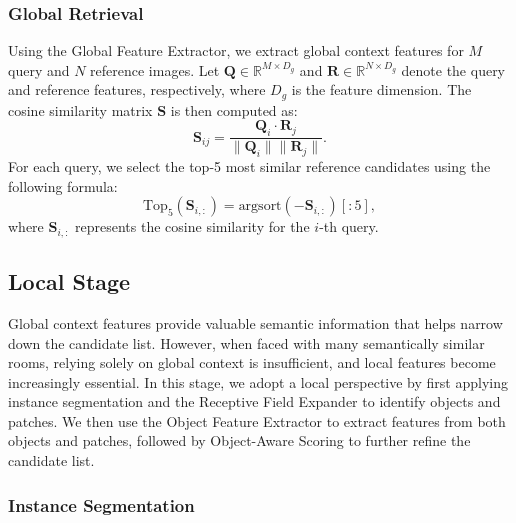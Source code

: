 \subsubsection{Global Retrieval}

Using the Global Feature Extractor, we extract global context features for \(M\) query and \(N\) reference images. Let \(\mathbf{Q} \in \mathbb{R}^{M \times D_g}\) and \(\mathbf{R} \in \mathbb{R}^{N \times D_g}\) denote the query and reference features, respectively, where \(D_g\) is the feature dimension. The cosine similarity matrix \(\mathbf{S}\) is then computed as:
\begin{equation}
    \mathbf{S}_{ij} = \frac{\mathbf{Q}_i \cdot \mathbf{R}_j}{\|\mathbf{Q}_i\| \|\mathbf{R}_j\|}.
    \label{eq:global feature cosine similarity}
\end{equation}
For each query, we select the top-5 most similar reference candidates using the following formula:
\begin{equation}
    \text{Top}_5(\mathbf{S}_{i, :}) = \text{argsort}(-\mathbf{S}_{i, :})[:5],
    \label{eq:global retrieval}
\end{equation}
where \(\mathbf{S}_{i, :}\) represents the cosine similarity for the \(i\)-th query.

\subsection{Local Stage}

Global context features provide valuable semantic information that helps narrow down the candidate list. However, when faced with many semantically similar rooms, relying solely on global context is insufficient, and local features become increasingly essential. In this stage, we adopt a local perspective by first applying instance segmentation and the Receptive Field Expander to identify objects and patches. We then use the Object Feature Extractor to extract features from both objects and patches, followed by Object-Aware Scoring to further refine the candidate list.

\subsubsection{Instance Segmentation}

